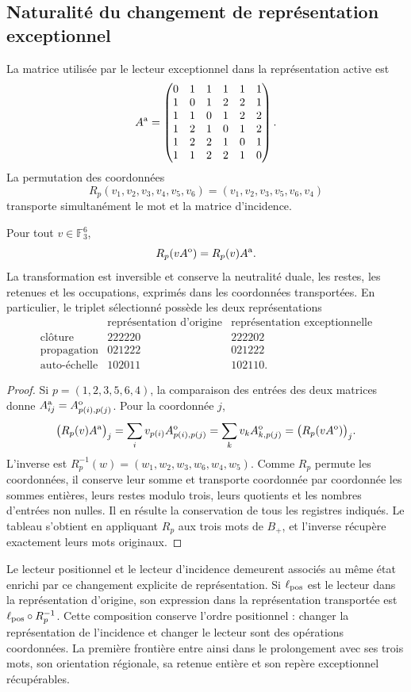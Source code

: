 \subsection{Naturalité du changement de représentation exceptionnel}

La matrice utilisée par le lecteur exceptionnel dans la représentation active est
\[
A^{\rm a}=\begin{pmatrix}
0&1&1&1&1&1\\1&0&1&2&2&1\\1&1&0&1&2&2\\
1&2&1&0&1&2\\1&2&2&1&0&1\\1&1&2&2&1&0
\end{pmatrix}.
\]
La permutation des coordonnées
\[
R_p(v_1,v_2,v_3,v_4,v_5,v_6)
=(v_1,v_2,v_3,v_5,v_6,v_4)
\]
transporte simultanément le mot et la matrice d’incidence.

\begin{theorem}
\label{r36c:thm:cambio}
Pour tout $v\in\mathbb F_3^6$,
\[
R_p(vA^{\rm o})=R_p(v)A^{\rm a}.
\]
La transformation est inversible et conserve la neutralité duale, les restes, les retenues et les occupations, exprimés dans les coordonnées transportées. En particulier, le triplet sélectionné possède les deux représentations
\[
\begin{array}{c|c|c}
&\text{représentation d'origine}&\text{représentation exceptionnelle}\\\hline
\text{clôture}&222220&222202\\
\text{propagation}&021222&021222\\
\text{auto-échelle}&102011&102110.
\end{array}
\]
\end{theorem}
\begin{proof}
Si $p=(1,2,3,5,6,4)$, la comparaison des entrées des deux matrices donne $A^{\rm a}_{ij}=A^{\rm o}_{p(i),p(j)}$. Pour la coordonnée $j$,
\[
\bigl(R_p(v)A^{\rm a}\bigr)_j
=\sum_i v_{p(i)}A^{\rm o}_{p(i),p(j)}
=\sum_kv_kA^{\rm o}_{k,p(j)}
=\bigl(R_p(vA^{\rm o})\bigr)_j.
\]
L’inverse est $R_p^{-1}(w)=(w_1,w_2,w_3,w_6,w_4,w_5)$. Comme $R_p$ permute les coordonnées, il conserve leur somme et transporte coordonnée par coordonnée les sommes entières, leurs restes modulo trois, leurs quotients et les nombres d’entrées non nulles. Il en résulte la conservation de tous les registres indiqués. Le tableau s’obtient en appliquant $R_p$ aux trois mots de $B_+$, et l’inverse récupère exactement leurs mots originaux.
\end{proof}

Le lecteur positionnel et le lecteur d’incidence demeurent associés au même état enrichi par ce changement explicite de représentation. Si $\ell_{\rm pos}$ est le lecteur dans la représentation d’origine, son expression dans la représentation transportée est $\ell_{\rm pos}\circ R_p^{-1}$. Cette composition conserve l’ordre positionnel : changer la représentation de l’incidence et changer le lecteur sont des opérations coordonnées. La première frontière entre ainsi dans le prolongement avec ses trois mots, son orientation régionale, sa retenue entière et son repère exceptionnel récupérables.
